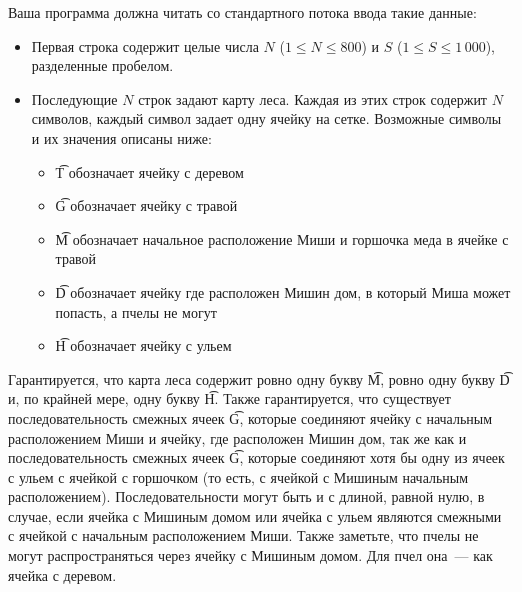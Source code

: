 Ваша программа должна читать со стандартного потока ввода такие данные:
\begin{itemize}
\item Первая строка содержит целые числа $N$ ($1 \le N \le 800$) и $S$ ($1 \le S \le 1\,000$), разделенные пробелом.
\item Последующие $N$ строк задают карту леса. Каждая из этих строк содержит $N$ символов, каждый
символ задает одну ячейку на сетке. Возможные символы и их значения описаны ниже:
\begin{itemize}
\item \t{T} обозначает ячейку с деревом
\item \t{G} обозначает ячейку с травой
\item \t{M} обозначает начальное расположение Миши и горшочка меда в ячейке с травой
\item \t{D} обозначает ячейку где расположен Мишин дом, в который Миша может попасть, а пчелы не
могут
\item \t{H} обозначает ячейку с ульем
\end{itemize}
\end{itemize}

Гарантируется, что карта леса содержит ровно одну букву \t{M}, ровно одну букву
\t{D} и, по крайней мере, одну букву \t{H}. Также гарантируется, что существует последовательность смежных ячеек \t{G}, которые соединяют ячейку с начальным расположением Миши и ячейку, где расположен Мишин дом, так же как и последовательность смежных ячеек \t{G}, которые соединяют хотя бы одну из ячеек с ульем с ячейкой с горшочком (то есть, с ячейкой с Мишиным начальным расположением). Последовательности могут быть и с длиной, равной нулю, в случае, если ячейка с Мишиным домом или ячейка с ульем являются смежными с ячейкой с начальным расположением Миши. Также заметьте, что пчелы не могут распространяться через ячейку с Мишиным домом. Для пчел она~--- как ячейка с деревом.